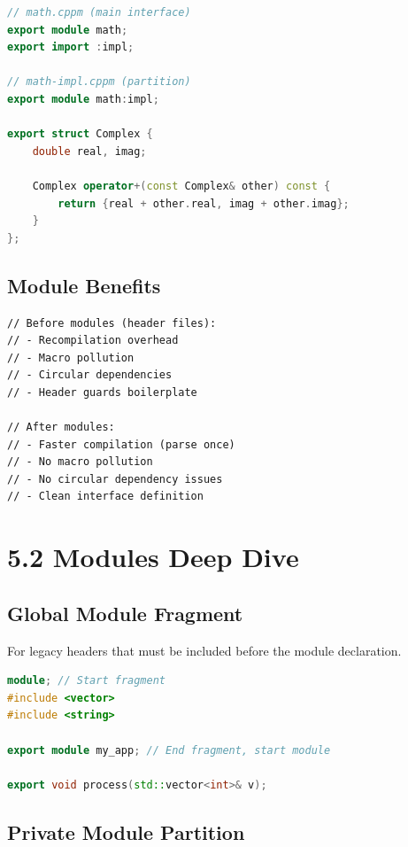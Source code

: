 \begin{lstlisting}[language={C++}]
// math.cppm (main interface)
export module math;
export import :impl;

// math-impl.cppm (partition)
export module math:impl;

export struct Complex {
    double real, imag;
    
    Complex operator+(const Complex& other) const {
        return {real + other.real, imag + other.imag};
    }
};
\end{lstlisting}

\hypertarget{module-benefits}{%
\subsection{Module Benefits}\label{module-benefits}}

\begin{lstlisting}
// Before modules (header files):
// - Recompilation overhead
// - Macro pollution
// - Circular dependencies
// - Header guards boilerplate

// After modules:
// - Faster compilation (parse once)
// - No macro pollution
// - No circular dependency issues
// - Clean interface definition
\end{lstlisting}

\hypertarget{modules-deep-dive}{%
\section{5.2 Modules Deep Dive}\label{modules-deep-dive}}

\hypertarget{global-module-fragment}{%
\subsection{Global Module Fragment}\label{global-module-fragment}}

For legacy headers that must be included before the module declaration.

\begin{lstlisting}[language={C++}]
module; // Start fragment
#include <vector>
#include <string>

export module my_app; // End fragment, start module

export void process(std::vector<int>& v);
\end{lstlisting}

\hypertarget{private-module-partition}{%
\subsection{Private Module Partition}\label{private-module-partition}}

